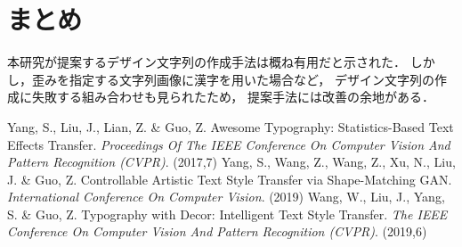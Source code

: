 \documentclass[autodetect-engine,dvi=dvipdfmx,ja=standard,a4j,jbase=10.5pt,twoside,twocolumn,magstyle=nomag*]{bxjsarticle}
\begin{document}
\section{まとめ}\label{sec:summary}
本研究が提案するデザイン文字列の作成手法は概ね有用だと示された．
しかし，歪みを指定する文字列画像に漢字を用いた場合など，
デザイン文字列の作成に失敗する組み合わせも見られたため，
提案手法には改善の余地がある．
\begin{thebibliography}{9}
    Yang, S., Liu, J., Lian, Z. \& Guo, Z. Awesome Typography: Statistics-Based Text Effects Transfer. {\em Proceedings Of The IEEE Conference On Computer Vision And Pattern Recognition (CVPR)}. (2017,7)
    Yang, S., Wang, Z., Wang, Z., Xu, N., Liu, J. \& Guo, Z. Controllable Artistic Text Style Transfer via Shape-Matching GAN. {\em International Conference On Computer Vision}. (2019)
    Wang, W., Liu, J., Yang, S. \& Guo, Z. Typography with Decor: Intelligent Text Style Transfer. {\em The IEEE Conference On Computer Vision And Pattern Recognition (CVPR)}. (2019,6)
\end{thebibliography}
\end{document}
